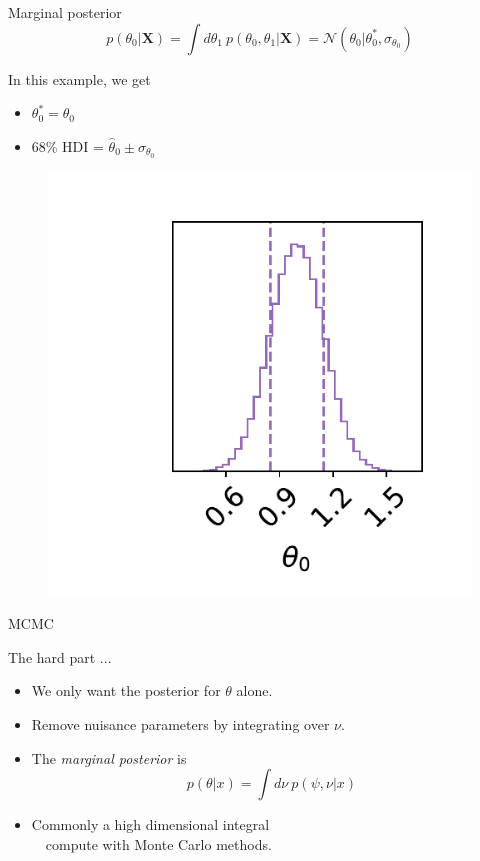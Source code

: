 \documentclass[
aspectratio=169,
14pt,
professionalfonts
]{beamer}
\newcommand{\arrow}{~\ding{220}~}
\begin{document}
\begin{frame}{Marginal posterior}
\vspace{-1cm}
    $$p(\theta_0|\boldsymbol{X}) = \int d\theta_1 ~ p(\theta_0, \theta_1|\boldsymbol{X}) = \mathcal{N}(\theta_0 | \theta_0^*, \sigma_{\theta_0})$$
    \begin{minipage}{0.4\linewidth}
    In this example, we get
        \begin{itemize}
            \item $\theta_0^* = \hat \theta_0$
            \item 68\% HDI = $\hat \theta_0 \pm \sigma_{\theta_0}$
        \end{itemize}
    \end{minipage}
    \begin{minipage}{0.59\linewidth}
    \begin{figure}
        \centering
        \includegraphics[width=0.7\linewidth]{../plots/marginal_posterior.pdf}
    \end{figure}
    \end{minipage}
\end{frame}

\begin{frame}
\center
\Large
MCMC
\end{frame}

\begin{frame}{The hard part ...}
\begin{itemize}
    \item We only want the posterior for $\theta$ alone.
    \item Remove nuisance parameters by integrating over $\nu$.
    \item[\arrow] The \textit{marginal posterior} is
        $$
        p(\theta | x) = \int d\nu ~ p(\psi, \nu | x)
        $$
    \item Commonly a high dimensional integral\\ \arrow compute with Monte Carlo methods.
\end{itemize}
\end{frame}
\end{document}
